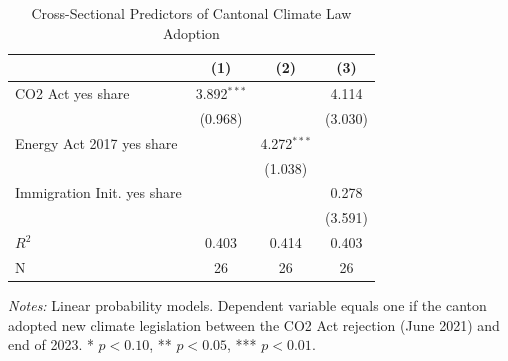 \begin{table}[H]
\centering
\caption{Cross-Sectional Predictors of Cantonal Climate Law Adoption}
\begin{threeparttable}
\begin{tabular}{lccc}
\toprule
& (1) & (2) & (3) \\
\midrule
CO2 Act yes share & 3.892$^{***}$ & & 4.114 \\
& (0.968) & & (3.030) \\
Energy Act 2017 yes share & & 4.272$^{***}$ & \\
& & (1.038) & \\
Immigration Init. yes share & & & 0.278 \\
& & & (3.591) \\
\midrule
$R^2$ & 0.403 & 0.414 & 0.403 \\
N & 26 & 26 & 26 \\
\bottomrule
\end{tabular}
\begin{tablenotes}[flushleft]
\small
\item \textit{Notes:} Linear probability models. Dependent variable equals one if the canton adopted new climate legislation between the CO2 Act rejection (June 2021) and end of 2023. * $p<0.10$, ** $p<0.05$, *** $p<0.01$.
\end{tablenotes}
\end{threeparttable}
\label{tab:adoption}
\end{table}
